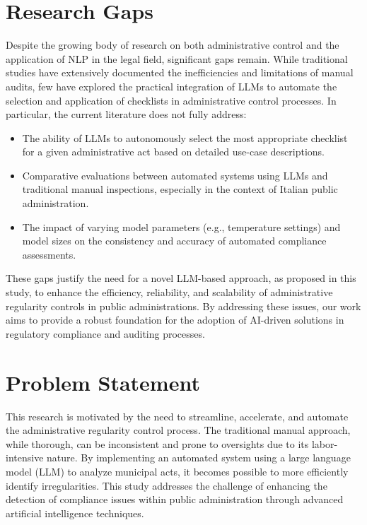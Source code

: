 \documentclass[../main.tex]{subfiles}
\begin{document}
\section{Research Gaps}
Despite the growing body of research on both administrative control and the application of NLP in the legal field, significant gaps remain. While traditional studies have extensively documented the inefficiencies and limitations of manual audits, few have explored the practical integration of LLMs to automate the selection and application of checklists in administrative control processes. In particular, the current literature does not fully address:
\begin{itemize}
    \item The ability of LLMs to autonomously select the most appropriate checklist for a given administrative act based on detailed use-case descriptions.
    \item Comparative evaluations between automated systems using LLMs and traditional manual inspections, especially in the context of Italian public administration.
    \item The impact of varying model parameters (e.g., temperature settings) and model sizes on the consistency and accuracy of automated compliance assessments.
\end{itemize}
These gaps justify the need for a novel LLM-based approach, as proposed in this study, to enhance the efficiency, reliability, and scalability of administrative regularity controls in public administrations. By addressing these issues, our work aims to provide a robust foundation for the adoption of AI-driven solutions in regulatory compliance and auditing processes.


\section{Problem Statement}
This research is motivated by the need to streamline, accelerate, and automate the administrative regularity control process. The traditional manual approach, while thorough, can be inconsistent and prone to oversights due to its labor-intensive nature. By implementing an automated system using a large language model (LLM) to analyze municipal acts, it becomes possible to more efficiently identify irregularities. This study addresses the challenge of enhancing the detection of compliance issues within public administration through advanced artificial intelligence techniques.
\end{document}
